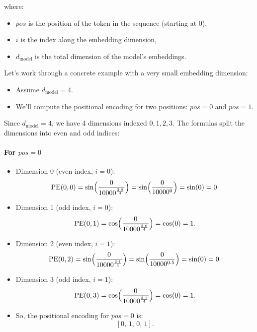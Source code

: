 where:
\begin{itemize}
	\item \( pos \) is the position of the token in the sequence (starting at 0),
	\item \( i \) is the index along the embedding dimension,
	\item \( d_{\text{model}} \) is the total dimension of the model’s embeddings.
\end{itemize}

Let's work through a concrete example with a very small embedding dimension:
\begin{itemize}
	\item Assume \( d_{\text{model}} = 4 \).  
	\item We’ll compute the positional encoding for two positions: \( pos = 0 \) and \( pos = 1 \).
\end{itemize}

Since \( d_{\text{model}} = 4 \), we have 4 dimensions indexed \(0, 1, 2, 3\). The formulas split the dimensions into even and odd indices:

\paragraph{For \( pos = 0 \)}
\begin{itemize}
\item Dimension 0 (even index, \( i = 0 \)):
 \[
 \text{PE}(0,0) = \sin\Bigl(\frac{0}{10000^{\frac{2\cdot0}{4}}}\Bigr) = \sin\Bigl(\frac{0}{10000^0}\Bigr) = \sin(0) = 0.
 \]
\item Dimension 1 (odd index, \( i = 0 \)):
 \[
 \text{PE}(0,1) = \cos\Bigl(\frac{0}{10000^{\frac{2\cdot0}{4}}}\Bigr) = \cos(0) = 1.
 \]
\item Dimension 2 (even index, \( i = 1 \)):
 \[
 \text{PE}(0,2) = \sin\Bigl(\frac{0}{10000^{\frac{2\cdot1}{4}}}\Bigr) = \sin\Bigl(\frac{0}{10000^{0.5}}\Bigr) = \sin(0) = 0.
 \]

\item Dimension 3 (odd index, \( i = 1 \)):
 \[
 \text{PE}(0,3) = \cos\Bigl(\frac{0}{10000^{\frac{2\cdot1}{4}}}\Bigr) = \cos(0) = 1.
 \]
\item So, the positional encoding for \( pos = 0 \) is:
\[
[0,\, 1,\, 0,\, 1].
\]
\end{itemize}

